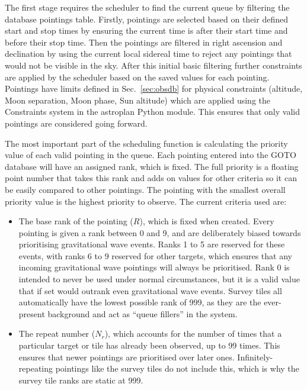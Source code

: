 \begin{colsection}
\begin{colsection}
The first stage requires the scheduler to find the current queue by filtering the database pointings table. Firstly, pointings are selected based on their defined start and stop times by ensuring the current time is after their start time and before their stop time. Then the pointings are filtered in right ascension and declination by using the current local sidereal time to reject any pointings that would not be visible in the sky. After this initial basic filtering further constraints are applied by the scheduler based on the saved values for each pointing. Pointings have limits defined in Sec.~\ref{sec:obsdb} for physical constraints (altitude, Moon separation, Moon phase, Sun altitude) which are applied using the Constraints system in the \textsf{astroplan} Python module\cite{astroplan}. This ensures that only valid pointings are considered going forward.

The most important part of the scheduling function is calculating the priority value of each valid pointing in the queue. Each pointing entered into the GOTO database will have an assigned rank, which is fixed. The full priority is a floating point number that takes this rank and adds on values for other criteria so it can be easily compared to other pointings. The pointing with the smallest overall priority value is the highest priority to observe. The current criteria used are:

\begin{itemize}

\item The base rank of the pointing ($R$), which is fixed when created. Every pointing is given a rank between 0 and 9, and are deliberately biased towards prioritising gravitational wave events. Ranks 1 to 5 are reserved for these events, with ranks 6 to 9 reserved for other targets, which ensures that any incoming gravitational wave pointings will always be prioritised. Rank 0 is intended to never be used under normal circumstances, but it is a valid value that if set would outrank even gravitational wave events. Survey tiles all automatically have the lowest possible rank of 999, as they are the ever-present background and act as ``queue fillers'' in the system.

\item The repeat number ($N_{r}$), which accounts for the number of times that a particular target
or tile has already been observed, up to 99 times. This ensures that newer pointings are prioritised over later ones. Infinitely-repeating pointings like the survey tiles do not include this, which is why the survey tile ranks are static at 999.


\end{itemize}
\end{colsection}
\end{colsection}
